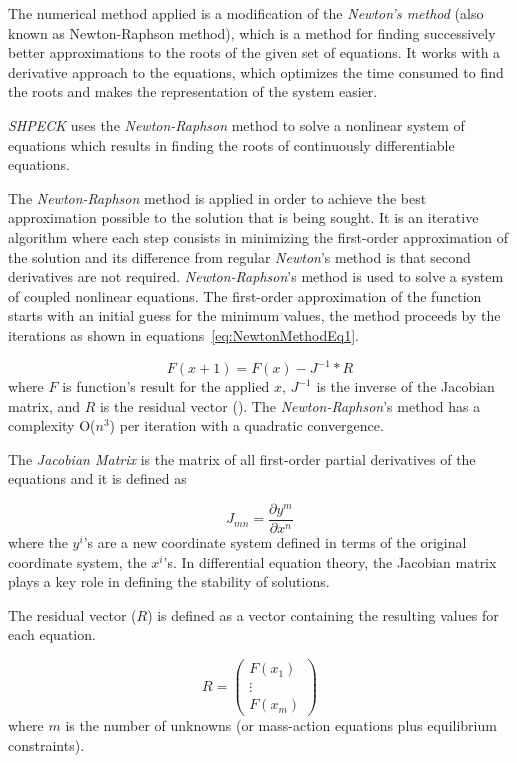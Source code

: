 The numerical method applied is a modification of the \emph{Newton's method} (also known as Newton-Raphson method), which is a method for finding successively better approximations to the roots of the given set of equations. It works with a derivative approach to the equations, which optimizes the time consumed to find the roots and makes the representation of the system easier.

\emph{SHPECK} uses the \emph{Newton-Raphson} method to solve a nonlinear system of equations which results in finding the roots of continuously differentiable equations. 

The \emph{Newton-Raphson} method is applied in order to achieve the best approximation possible to the solution that is being sought. It is an iterative algorithm where each step consists in minimizing the first-order approximation of the solution and its difference from regular \emph{Newton}'s method is that second derivatives are not required. \emph{Newton-Raphson}'s method is used to solve a system of coupled nonlinear equations. The first-order approximation of the function starts with an initial guess for the minimum values, the method proceeds by the iterations as shown in equations~\ref{eq:NewtonMethodEq1}.

\begin{equation}
\label{eq:NewtonMethodEq1}
F(x+1) = F(x) - J^{-1} * R
\end{equation}
where $F$ is function's result for the applied $x$, $J^{-1}$ is the inverse of the Jacobian matrix, and $R$ is the residual vector (\cite{Isaacson:66}). The \emph{Newton-Raphson}'s method has a complexity O($n^3$) per iteration with a quadratic convergence.

The \emph{Jacobian Matrix} is the matrix of all first-order partial derivatives of the equations and it is defined as

\begin{equation}
\label{eq:JacobianDefinition}
J_{mn} = \frac{\partial y^m}{\partial x^n}
\end{equation}
where the $y^i$'s are a new coordinate system defined in terms of the original coordinate system, the $x^i$'s. In differential equation theory, the Jacobian matrix plays a key role in defining the stability of solutions.

The residual vector ($R$) is defined as a vector containing the resulting values for each equation.

\begin{equation}
\label{eq:residualVector}
R = \begin{pmatrix}
 F(x_1) \\
 \vdots \\
 F(x_m)
 \end{pmatrix}
\end{equation}
where $m$ is the number of unknowns (or mass-action equations plus equilibrium constraints).


